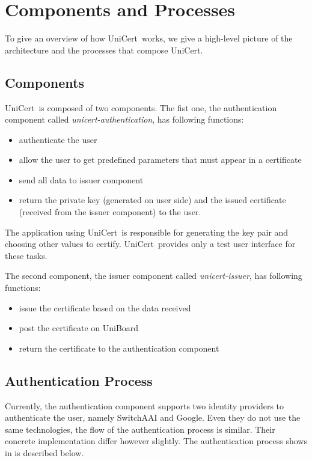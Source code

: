 \documentclass[oneside]{scrreprt}
\newcommand{\uniboard}{\mbox{UniBoard}}
\newcommand{\unicert}{\mbox{UniCert}}
\begin{document}
\chapter{Components and Processes} \label{chap:process}

To give an overview of how \unicert\ works, we give a high-level picture of the architecture and the processes that compose \unicert.

\section{Components}

\unicert\ is composed of two components. The fist one, the authentication component called \textit{unicert-authentication}, has following functions:
\begin{itemize}
\item authenticate the user
\item allow the user to get predefined parameters that must appear in a certificate
\item send all data to issuer component
\item return the private key (generated on user side) and the issued certificate (received from the issuer component) to the user.
\end{itemize}
The application using \unicert\ is responsible for generating the key pair and choosing other values to certify. \unicert\ provides only a test user interface for these tasks.

The second component, the issuer component called \textit{unicert-issuer}, has following functions:
\begin{itemize}
\item issue the certificate based on the data received
\item post the certificate on \uniboard
\item return the certificate to the authentication component
\end{itemize}

\section{Authentication Process} \label{sec:auth_process}


Currently, the authentication component supports two identity providers to authenticate the user, namely SwitchAAI and Google. Even they do not use the same technologies, the flow of the authentication process is similar. Their concrete implementation differ however slightly. The authentication process shows in  is described below.
\end{document}
